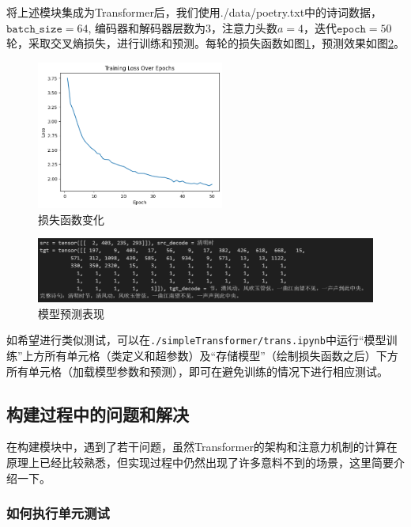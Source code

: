 将上述模块集成为Transformer后，我们使用./data/poetry.txt中的诗词数据，$\texttt{batch\_size} = 64$, 编码器和解码器层数为$3$，注意力头数$a=4$，迭代$\texttt{epoch} = 50$轮，采取交叉熵损失，进行训练和预测。每轮的损失函数如图\ref{fig:simpleT-loss}，预测效果如图\ref{fig:simpleT-performance}。
\begin{figure}[h]
    \centering
    \includegraphics[width = 0.55\textwidth]{img/simpleT/simpleT-loss.png}
    \caption{损失函数变化}
    \label{fig:simpleT-loss}
\end{figure}

\begin{figure}[h]
    \centering
    \includegraphics[width = \textwidth]{img/simpleT/simpleT-performance.png}
    \caption{模型预测表现}
    \label{fig:simpleT-performance}
\end{figure}

如希望进行类似测试，可以在\texttt{./simpleTransformer/trans.ipynb}中运行“模型训练”上方所有单元格（类定义和超参数）及“存储模型”（绘制损失函数之后）下方所有单元格（加载模型参数和预测），即可在避免训练的情况下进行相应测试。

\subsection{构建过程中的问题和解决}

在构建模块中，遇到了若干问题，虽然Transformer的架构和注意力机制的计算在原理上已经比较熟悉，但实现过程中仍然出现了许多意料不到的场景，这里简要介绍一下。

\subsubsection{如何执行单元测试}

